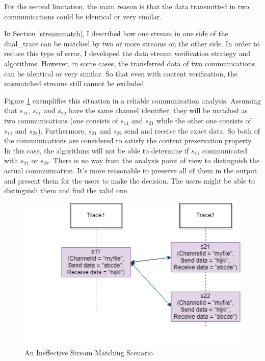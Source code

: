 For the second limitation, the main reason is that the data transmitted in two communications could be identical or very similar. 

In Section \ref{streammatch}, I described how one stream in one side of the dual\_trace can be matched by two or more streams on the other side. In order to reduce this type of error, I developed the data stream verification strategy and algorithms. However, in some cases, the transferred data of two communications can be identical or very similar. So that even with content verification, the mismatched streams still cannot be excluded.

Figure \ref{secondlevelmatching} exemplifies this situation in a reliable communication analysis. Assuming that $s_{11}$, $s_{21}$ and $s_{22}$ have the same channel identifier, they will be matched as two communications (one consists of $s_{11}$ and $s_{21}$ while the other one consists of $s_{11}$ and $s_{22}$). Furthermore, $s_{21}$ and $s_{22}$ send and receive the exact data. So both of the communications are considered to satisfy the content preservation property. In this case, the algorithms will not be able to determine if  $s_{11}$ communicated with $s_{21}$ or $s_{22}$. There is no way from the analysis point of view to distinguish the actual communication. It's more reasonable to preserve all of them in the output and present them for the users to make the decision. The users might be able to distinguish them and find the valid one.


\begin{figure}[H]
\centerline{\includegraphics[scale=0.6]{Figures/secondlevelmatching}}
 \caption{An Ineffective Stream Matching Scenario}
\label{secondlevelmatching}
\end{figure}



